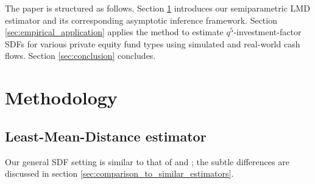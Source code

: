 \documentclass[12pt]{article}
\begin{document}
The paper is structured as follows. 
Section \ref{sec:Methodology} introduces our semiparametric LMD estimator and its corresponding asymptotic inference framework.
Section \ref{sec:empirical_application} applies the method to estimate $q^5$-investment-factor SDFs for various private equity fund types using simulated and real-world cash flows.
Section \ref{sec:conclusion} concludes.


\section{Methodology}
\label{sec:Methodology}

\subsection{Least-Mean-Distance estimator}
\label{sec:fundwise_lmd_estimator}

Our general SDF setting is similar to that of \cite{DLP12} and \cite{KN16}; the subtle differences are discussed in section \ref{sec:comparison_to_similar_estimators}.
\end{document}
